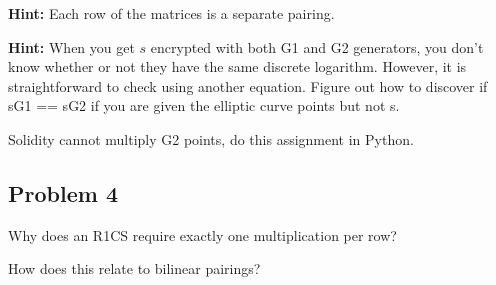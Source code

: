 \documentclass{article}
\begin{document}
\textbf{Hint:} Each row of the matrices is a separate pairing.

\textbf{Hint:} When you get $s$ encrypted with both G1 and G2 generators, you don't know whether or not they have the same discrete logarithm. However, it is straightforward to check using another equation. Figure out how to discover if sG1 == sG2 if you are given the elliptic curve points but not s.

Solidity cannot multiply G2 points, do this assignment in Python.

\subsection*{Problem 4}

Why does an R1CS require exactly one multiplication per row?

How does this relate to bilinear pairings?
\end{document}
